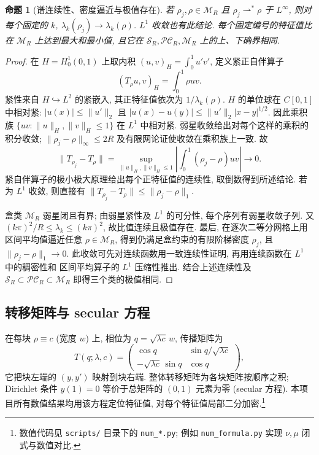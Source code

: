 \documentclass[UTF8]{ctexart}
\newtheorem{proposition}[theorem]{命题}
\begin{document}
\begin{proposition}[谱连续性、密度逼近与极值存在]\label{prop:compactness}
若 $\rho_j,\rho\in\mathcal M_R$ 且 $\rho_j\rightharpoonup^*\rho$ 于 $L^\infty$,
则对每个固定的 $k$, $\lambda_k(\rho_j)\to\lambda_k(\rho)$.
$L^1$ 收敛也有此结论. 每个固定编号的特征值比在 $\mathcal M_R$ 上达到最大和最小值,
且它在 $\mathcal S_R,\mathcal{PC}_R,\mathcal M_R$ 上的上、下确界相同.
\end{proposition}

\begin{proof}
在 $H=H^1_0(0,1)$ 上取内积 $(u,v)_H=\int_0^1u'v'$, 定义紧正自伴算子
\[
 (T_\rho u,v)_H=\int_0^1\rho uv.
\]
紧性来自 $H\hookrightarrow L^2$ 的紧嵌入, 其正特征值依次为 $1/\lambda_k(\rho)$.
$H$ 的单位球在 $C[0,1]$ 中相对紧: $|u(x)|\leq\|u'\|_2$ 且
$|u(x)-u(y)|\leq\|u'\|_2|x-y|^{1/2}$. 因此乘积族
$\{uv:\|u\|_H,\|v\|_H\leq1\}$ 在 $L^1$ 中相对紧.
弱星收敛给出对每个这样的乘积的积分收敛; $\|\rho_j-\rho\|_\infty\leq2R$
及有限网论证使收敛在乘积族上一致. 故
\[
 \|T_{\rho_j}-T_\rho\|
 =\sup_{\|u\|_H,\|v\|_H\leq1}\left|\int_0^1(\rho_j-\rho)uv\right|\longrightarrow0.
\]
紧自伴算子的极小极大原理给出每个正特征值的连续性, 取倒数得到所述结论.
若为 $L^1$ 收敛, 则直接有 $\|T_{\rho_j}-T_\rho\|\leq\|\rho_j-\rho\|_1$.

盒类 $\mathcal M_R$ 弱星闭且有界; 由弱星紧性及 $L^1$ 的可分性,
每个序列有弱星收敛子列. 又
$(k\pi)^2/R\leq\lambda_k\leq(k\pi)^2$, 故比值连续且极值存在.
最后, 在逐次二等分网格上用区间平均值逼近任意 $\rho\in\mathcal M_R$,
得到仍满足盒约束的有限阶梯密度 $\rho_j$, 且 $\|\rho_j-\rho\|_1\to0$.
此收敛可先对连续函数用一致连续性证明, 再用连续函数在 $L^1$ 中的稠密性和
区间平均算子的 $L^1$ 压缩性推出. 结合上述连续性及
$\mathcal S_R\subset\mathcal{PC}_R\subset\mathcal M_R$ 即得三个类的极值相同.
\end{proof}

\subsection{转移矩阵与 secular 方程}

在每块 $\rho \equiv c$ (宽度 $w$) 上, 相位为 $q = \sqrt{\lambda c}\,w$, 传播矩阵为
\begin{equation}
	T(q; \lambda, c) =
	\begin{pmatrix}
		\cos q & \sin q / \sqrt{\lambda c} \\
		-\sqrt{\lambda c}\,\sin q & \cos q
	\end{pmatrix},
\end{equation}
它把块左端的 $(y, y')$ 映射到块右端. 整体转移矩阵为各块矩阵按顺序之积;
Dirichlet 条件 $y(1) = 0$ 等价于总矩阵的 $(0,1)$ 元素为零 (secular 方程).
本项目所有数值结果均用该方程定位特征值, 对每个特征值局部二分加密.\footnote{数值代码见 \texttt{scripts/} 目录下的 \texttt{num\_*.py}; 例如 \texttt{num\_formula.py} 实现 $\nu, \mu$ 闭式与数值对比.}
\end{document}
